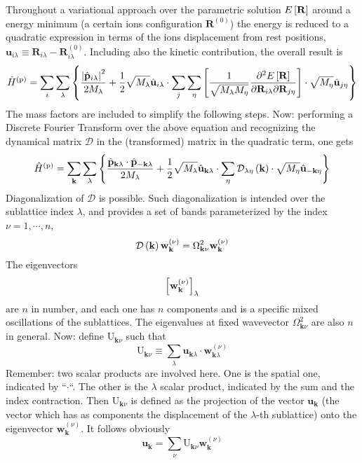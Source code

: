 Throughout a variational approach over the parametric solution $E\left[{\mathbf{R}}\right]$ around a energy minimum (a certain ions configuration $\mathbf{
R}^{(0)}$) the energy is reduced to a quadratic expression in terms of the ions displacement from rest positions, $\mathbf{u}_{i\lambda} \equiv \mathbf{R}_{i\lambda} - \mathbf{R}_{i\lambda}^{(0)}$. Including also the kinetic contribution, the overall result is
\[
	\hat H^{(\mathrm{p})} = \sum_i \sum_\lambda
	\lrB{
		\frac{\abs{\hat{\mathbf{p}}_{i\lambda}}^2}{2M_\lambda}
		+ \half \sqrt{M_\lambda} \hat{\mathbf{u}}_{i\lambda} \cdot \sum_j \sum_\eta 
		\lrS{
			\frac{1}{\sqrt{M_\lambda M_\eta}}
			\pdv[2]{E\lrS{\mathbf{R}}}{\mathbf{R}_{i\lambda}}{\mathbf{R}_{j\eta}}
		}
		\cdot
		\sqrt{M_\eta} \hat{\mathbf{u}}_{j\eta}
	}
\]
The mass factors are included to simplify the following steps.
Now: performing a Discrete Fourier Transform over the above equation and recognizing the dynamical matrix $\mathcal{D}$ in the (transformed) matrix in the quadratic term, one gets
\[
	\hat H^{(\mathrm{p})} = \sum_\mathbf{k} \sum_\lambda \lrB{
		\frac{\hat{\mathbf{p}}_{\mathbf{k}\lambda} \cdot \hat{\mathbf{p}}_{-\mathbf{k}\lambda}}{2M_\lambda}
		+ \half \sqrt{M_\lambda} \hat{\mathbf{u}}_{\mathbf{k}\lambda}\cdot \sum_\eta 
		\mathcal{D}_{\lambda\eta}\lrR{\mathbf{k}}
		\cdot
		\sqrt{M_\eta} \hat{\mathbf{u}}_{-\mathbf{k}\eta}
	}
\]
Diagonalization of $\mathcal{D}$ is possible. Such diagonalization is intended over the sublattice index $\lambda$, and provides a set of bands parameterized by the index $\nu=1,\cdots,n$, 
\[
	\mathcal{D}\left({\mathbf{k}}\right) \mathbf{w}_{\mathbf{k}}^{(\nu)} = \Omega_{\mathbf{k}\nu}^2 \mathbf{w}_{\mathbf{k}}^{(\nu)}
\]
The eigenvectors
\[
	\left[{\mathbf{w}_{\mathbf{k}}^{(\nu)}}\right]_\lambda
\]
are $n$ in number, and each one has $n$ components and is a specific mixed oscillations of the sublattices. The eigenvalues at fixed wavevector $\Omega_{\mathbf{k}\nu}^2$ are also $n$ in general. 
Now: define $\mathrm{U}_{\mathbf{k}\nu}$ such that
\[
	\mathrm{U}_{\mathbf{k}\nu} \equiv
	\sum_\lambda
	\mathbf{u}_{\mathbf{k}\lambda} \cdot
	\mathbf{w}_{\mathbf{k}\lambda}^{(\nu)}
\]
Remember: two scalar products are involved here. One is the spatial one, indicated by ``$\cdot$``. The other is the $\lambda$ scalar product, indicated by the sum and the index contraction. Then $\mathrm{U}_{\mathbf{k}\nu}$ is defined as the projection of the vector $\mathbf{u}_\mathbf{k}$ (the vector which has as components the displacement of the $\lambda$-th sublattice) onto the eigenvector $\mathbf{w}_{\mathbf{k}}^{(\nu)}$. It follows obviously
\begin{equation}\label{eq:bcs-definition of U}
	\mathbf{u}_\mathbf{k} = \sum_\nu \mathrm{U}_{\mathbf{k}\nu} \mathbf{w}_{\mathbf{k}}^{(\nu)}
\end{equation}
